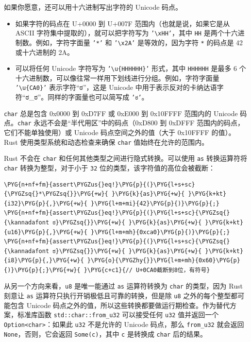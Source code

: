 如果你愿意，还可以用十六进制写出字符的 Unicode 码点。

\begin{itemize}
\item 如果字符的码点在 U+0000 到 U+007F 范围内（也就是说，如果它是从 ASCII 字符集中提取的），就可以把字符写为 \texttt{'\textbackslash{}xHH'}，其中 \texttt{HH} 是两个十六进制数。例如，字符字面量 \texttt{'*'} 和 \texttt{'\textbackslash{}x2A'} 是等效的，因为字符 \texttt{*} 的码点是 42 或十六进制的 2A。
\item 可以将任何 Unicode 字符写为 \texttt{'\textbackslash{}u\{HHHHHH\}'} 形式，其中 \texttt{HHHHHH} 是最多 6 个十六进制数，可以像往常一样用下划线进行分组。例如，字符字面量 \texttt{'\textbackslash{}u\{CA0\}'} 表示字符“ಠ”，这是 Unicode 中用于表示反对的卡纳达语字符“ಠ\_ಠ”。同样的字面量也可以简写成 \texttt{'ಠ'}。
\end{itemize}

\texttt{char} 总是包含 0x0000 到 0xD7FF 或 0xE000 到 0x10FFFF 范围内的 Unicode 码点。\texttt{char} 永远不会是“半代用区”中的码点（0xD800 到 0xDFFF 范围内的码点，它们不能单独使用）或 Unicode 码点空间之外的值（大于 0x10FFFF 的值）。Rust 使用类型系统和动态检查来确保 \texttt{char} 值始终在允许的范围内。

Rust 不会在 \texttt{char} 和任何其他类型之间进行隐式转换。可以使用 \texttt{as} 转换运算符将 \texttt{char} 转换为整型，对于小于 \texttt{32} 位的类型，该字符值的高位会被截断：

\begin{Verbatim}[commandchars=\\\{\},breaklines=true,breakanywhere=true,fontsize=\codefont,xleftmargin=17bp]
\PYG{n+nf+fm}{assert\PYGZus{}eq!}\PYG{p}{(}\PYG{l+s+sc}{\PYGZsq{}*\PYGZsq{}}\PYG{+w}{ }\PYG{k}{as}\PYG{+w}{ }\PYG{k+kt}{i32}\PYG{p}{,}\PYG{+w}{ }\PYG{l+m+mi}{42}\PYG{p}{)}\PYG{p}{;}
\PYG{n+nf+fm}{assert\PYGZus{}eq!}\PYG{p}{(}\PYG{l+s+sc}{\PYGZsq{}{\kannadafont ಠ}\PYGZsq{}}\PYG{+w}{ }\PYG{k}{as}\PYG{+w}{ }\PYG{k+kt}{u16}\PYG{p}{,}\PYG{+w}{ }\PYG{l+m+mh}{0xca0}\PYG{p}{)}\PYG{p}{;}
\PYG{n+nf+fm}{assert\PYGZus{}eq!}\PYG{p}{(}\PYG{l+s+sc}{\PYGZsq{}{\kannadafont ಠ}\PYGZsq{}}\PYG{+w}{ }\PYG{k}{as}\PYG{+w}{ }\PYG{k+kt}{i8}\PYG{p}{,}\PYG{+w}{ }\PYG{o}{\PYGZhy{}}\PYG{l+m+mh}{0x60}\PYG{p}{)}\PYG{p}{;}\PYG{+w}{ }\PYG{c+c1}{// U+0CA0截断到8位，有符号}
\end{Verbatim}

从另一个方向来看，\texttt{u8} 是唯一能通过 \texttt{as} 运算符转换为 \texttt{char} 的类型，因为 Rust 刻意让 \texttt{as} 运算符只执行开销极低且可靠的转换，但是除 \texttt{u8} 之外的每个整型都可能包含 Unicode 码点之外的值，所以这些转换都要做运行期检查。作为替代方案，标准库函数 \texttt{std::char::from\_u32} 可以接受任何 \texttt{u32} 值并返回一个 \texttt{Option<char>}：如果此 \texttt{u32} 不是允许的 Unicode 码点，那么 \texttt{from\_u32} 就会返回 \texttt{None}，否则，它会返回 \texttt{Some(c)}，其中 \texttt{c} 是转换成 \texttt{char} 后的结果。

